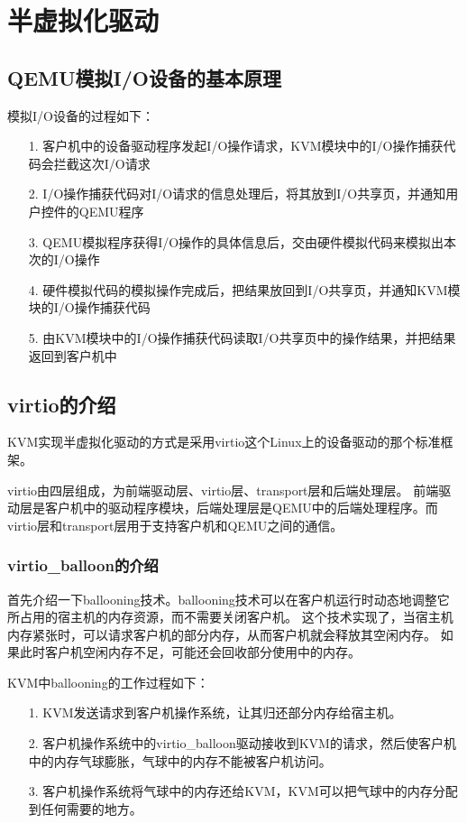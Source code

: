 \documentclass[a4paper,left=2.5cm,right=2.5cm,11pt]{article}
\begin{document}
\section{半虚拟化驱动}
\subsection{QEMU模拟I/O设备的基本原理}
	模拟I/O设备的过程如下：
	\begin{itemize}
		\item[1.] 客户机中的设备驱动程序发起I/O操作请求，KVM模块中的I/O操作捕获代码会拦截这次I/O请求
		\item[2.] I/O操作捕获代码对I/O请求的信息处理后，将其放到I/O共享页，并通知用户控件的QEMU程序
		\item[3.] QEMU模拟程序获得I/O操作的具体信息后，交由硬件模拟代码来模拟出本次的I/O操作
		\item[4.] 硬件模拟代码的模拟操作完成后，把结果放回到I/O共享页，并通知KVM模块的I/O操作捕获代码
		\item[5.] 由KVM模块中的I/O操作捕获代码读取I/O共享页中的操作结果，并把结果返回到客户机中
	\end{itemize}

\subsection{virtio的介绍}
	KVM实现半虚拟化驱动的方式是采用virtio这个Linux上的设备驱动的那个标准框架。\par
	virtio由四层组成，为前端驱动层、virtio层、transport层和后端处理层。
	前端驱动层是客户机中的驱动程序模块，后端处理层是QEMU中的后端处理程序。而virtio层和transport层用于支持客户机和QEMU之间的通信。\par

\subsubsection{virtio\_balloon的介绍}
	首先介绍一下ballooning技术。ballooning技术可以在客户机运行时动态地调整它所占用的宿主机的内存资源，而不需要关闭客户机。
	这个技术实现了，当宿主机内存紧张时，可以请求客户机的部分内存，从而客户机就会释放其空闲内存。
	如果此时客户机空闲内存不足，可能还会回收部分使用中的内存。\par

	KVM中ballooning的工作过程如下：
	\begin{itemize}
		\item[1.] KVM发送请求到客户机操作系统，让其归还部分内存给宿主机。
		\item[2.] 客户机操作系统中的virtio\_balloon驱动接收到KVM的请求，然后使客户机中的内存气球膨胀，气球中的内存不能被客户机访问。
		\item[3.] 客户机操作系统将气球中的内存还给KVM，KVM可以把气球中的内存分配到任何需要的地方。
	\end{itemize}
\end{document}
